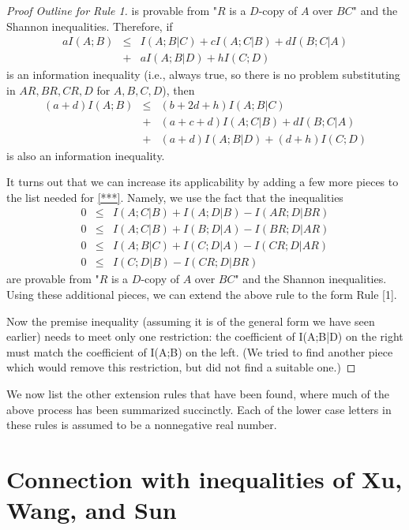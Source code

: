 \documentclass[10pt,journal]{IEEEtran}
\begin{document}
\begin{proof}[Proof Outline for Rule 1]
is provable from "$R$ is a $D$-copy of $A$ over $BC$" and the
Shannon inequalities.  Therefore, if
\begin{eqnarray*}
    aI(A;B) &\leq& I(A;B|C)+cI(A;C|B)+dI(B;C|A)\\
    &+&aI(A;B|D)+hI(C;D)
\end{eqnarray*}
is an information inequality (i.e., always true, so there is no
problem substituting in $AR,BR,CR,D$ for $A,B,C,D$), then
\begin{eqnarray*}
    (a+d)I(A;B) &\leq& (b+2d+h)I(A;B|C)\\
    &+&(a+c+d)I(A;C|B)+dI(B;C|A)\\
    &+&(a+d)I(A;B|D)+(d+h)I(C;D)
\end{eqnarray*}
is also an information inequality.

It turns out that we can increase its applicability
by adding a few more pieces to the list needed for \eqref{***}.  Namely, we
use the fact that the inequalities
\begin{eqnarray*}
            0 &\leq& I(A;C|B)+I(A;D|B)
                  -I(AR;D|BR)\\
            0 &\leq& I(A;C|B)+I(B;D|A)
                  -I(BR;D|AR)\\
            0 &\leq& I(A;B|C)+I(C;D|A)
                  -I(CR;D|AR)\\
            0 &\leq& I(C;D|B)
                  -I(CR;D|BR)
\end{eqnarray*}
are provable from "$R$ is a $D$-copy of $A$ over $BC$" and the
Shannon inequalities.  Using these additional pieces, we can extend
the above rule to the form Rule [1].

Now the premise inequality (assuming it is of the general form
we have seen earlier) needs to meet only one restriction:
the coefficient of I(A;B|D) on the right must match the
coefficient of I(A;B) on the left.  (We tried to find
another piece which would remove this restriction, but
did not find a suitable one.)
\end{proof}

We now list the other extension rules that have been found,
where much of the above process has been summarized succinctly.  Each of the
lower case letters in these rules is assumed to be a nonnegative real number.





\section{Connection with inequalities of Xu, Wang, and Sun}\label{XWS}
\end{document}
